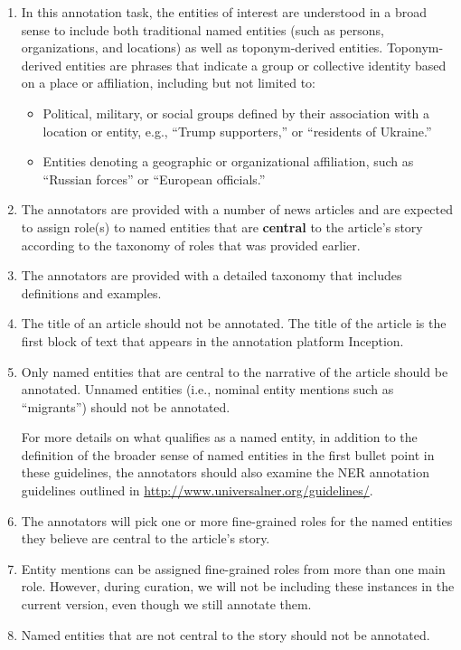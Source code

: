 \begin{enumerate}

    \item In this annotation task, the entities of interest are understood in a broad sense to include both traditional named entities (such as persons, organizations, and locations) as well as toponym-derived entities. Toponym-derived entities are phrases that indicate a group or collective identity based on a place or affiliation, including but not limited to:
    \begin{itemize}
        \item Political, military, or social groups defined by their association with a location or entity, e.g., ``Trump supporters,'' or ``residents of Ukraine.''
        \item Entities denoting a geographic or organizational affiliation, such as ``Russian forces'' or ``European officials.''
    \end{itemize}
        

    \item The annotators are provided with a number of news articles and are expected to assign role(s) to named entities that are \textbf{central} to the article's story according to the taxonomy of roles that was provided earlier. 
    \item The annotators are provided with a detailed taxonomy that includes definitions and examples. 
    \item The title of an article should not be annotated. The title of the article is the first block of text that appears in the annotation platform Inception.
    \item Only named entities that are central to the narrative of the article should be annotated. Unnamed entities (i.e., nominal entity mentions such as ``migrants'') should not be annotated. 

For more details on what qualifies as a named entity, in addition to the definition of the broader sense of named entities in the first bullet point in these guidelines, the annotators should also examine the NER annotation guidelines outlined in \url{http://www.universalner.org/guidelines/}.
    
    \item The annotators will pick one or more fine-grained roles for the named entities they believe are central to the article's story. 
    \item Entity mentions can be assigned fine-grained roles from more than one main role. However, during curation, we will not be including these instances in the current version, even though we still annotate them.
    \item Named entities that are not central to the story should not be annotated.


\end{enumerate}
